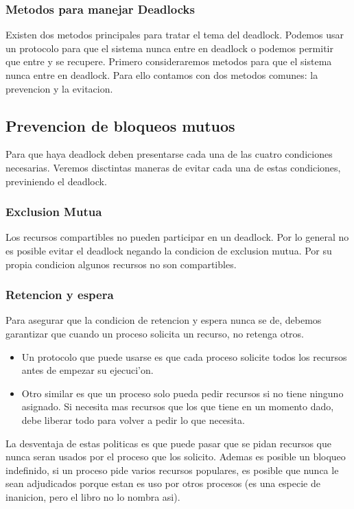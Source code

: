 \documentclass[a4paper,10pt]{article}
\begin{document}
\subsubsection{Metodos para manejar Deadlocks}
Existen dos metodos principales para tratar el tema del deadlock. Podemos usar un protocolo para que el sistema nunca entre en deadlock o podemos permitir que entre y se recupere.
Primero consideraremos metodos para que el sistema nunca entre en deadlock. Para ello contamos con dos metodos comunes: la prevencion y la evitacion.

\subsection{Prevencion de bloqueos mutuos}
Para que haya deadlock deben presentarse cada una de las cuatro condiciones necesarias. Veremos disctintas maneras de evitar cada una de estas condiciones, previniendo el deadlock.

\subsubsection{Exclusion Mutua}
Los recursos compartibles no pueden participar en un deadlock.
Por lo general no es posible evitar el deadlock negando la condicion de exclusion mutua. Por su propia condicion algunos recursos no son compartibles.

\subsubsection{Retencion y espera}
Para asegurar que la condicion de retencion y espera nunca se de, debemos garantizar que cuando un proceso solicita un recurso, no retenga otros.
\begin{itemize}
 \item Un protocolo que puede usarse es que cada proceso solicite todos los recursos antes de empezar su ejecuci'on.
 \item Otro similar es que un proceso solo pueda pedir recursos si no tiene ninguno asignado. Si necesita mas recursos que los que tiene en un momento dado, debe liberar todo para volver a pedir lo que necesita.
\end{itemize} 
La desventaja de estas politicas es que puede pasar que se pidan recursos que nunca seran usados por el proceso que los solicito.
Ademas es posible un bloqueo indefinido, si un proceso pide varios recursos populares, es posible que nunca le sean adjudicados porque estan es uso por otros procesos (es una especie de inanicion, pero el libro no lo nombra asi).
\end{document}
